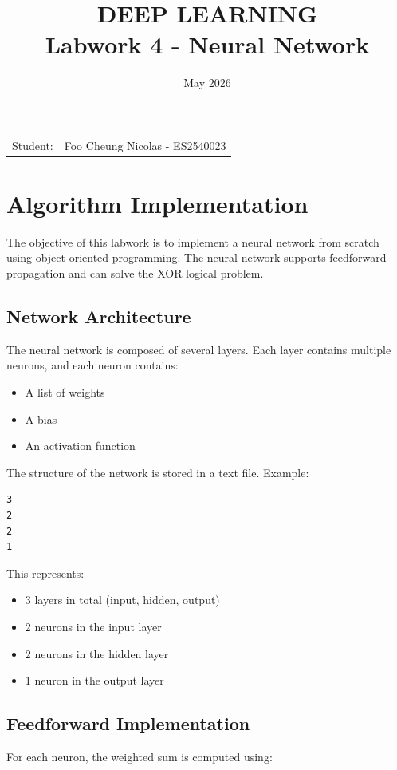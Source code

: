 \documentclass{article}
\title{\textbf{DEEP LEARNING} \\ 
{\Large \textbf{Labwork 4 - Neural Network}}}
\date{May 2026}
\begin{document}
\pagestyle{plain}
\maketitle

\noindent\begin{tabular}{@{}ll}
    Student: & Foo Cheung Nicolas - ES2540023 \\
\end{tabular}

\section{Algorithm Implementation}

The objective of this labwork is to implement a neural network from scratch using object-oriented programming. The neural network supports feedforward propagation and can solve the XOR logical problem.



\subsection{Network Architecture}

The neural network is composed of several layers. Each layer contains multiple neurons, and each neuron contains:

\begin{itemize}
    \item A list of weights
    \item A bias
    \item An activation function
\end{itemize}

The structure of the network is stored in a text file. Example:

\begin{verbatim}
3
2
2
1
\end{verbatim}

This represents:

\begin{itemize}
    \item 3 layers in total (input, hidden, output)
    \item 2 neurons in the input layer
    \item 2 neurons in the hidden layer
    \item 1 neuron in the output layer
\end{itemize}


\subsection{Feedforward Implementation}
For each neuron, the weighted sum is computed using:
\end{document}
